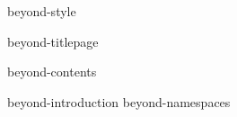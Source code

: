 

\environment beyond-style

\dontcomplain

\startdocument

    \component beyond-titlepage

    \startfrontmatter
        \component beyond-contents
    \stopfrontmatter

    \startbodymatter
        \component beyond-introduction
         \stopchapter
         \stopchapter
        \component beyond-namespaces
    \stopbodymatter

\stopdocument
